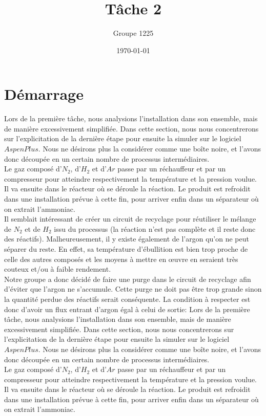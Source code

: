 \documentclass[a4paper, oneside, 12pt]{article}
\title{Tâche 2}
\author{Groupe 1225}
\date{\today}
\begin{document}
\maketitle

\section{Démarrage}

Lors de la première tâche, nous analysions l'installation dans son ensemble, mais de manière excessivement simplifiée. Dans cette section, nous nous concentrerons sur l'explicitation de la dernière étape pour ensuite la simuler sur le logiciel $Aspen Plus$. Nous ne désirons plus la considérer comme une boîte noire, et l'avons donc découpée en un certain nombre de processus intermédiaires.\\
Le gaz composé d'$N_2$, d'$H_2$ et d'$Ar$ passe par un réchauffeur et par un compresseur pour atteindre respectivement la température et la pression voulue. Il va ensuite dans le réacteur où se déroule la réaction. Le produit est refroidit dans une installation prévue à cette fin, pour arriver enfin dans un séparateur où on extrait l'ammoniac.\\
Il semblait intéressant de créer un circuit de recyclage pour réutiliser le mélange de $N_2$ et de $H_2$ issu du processus (la réaction n'est pas complète et il reste donc des réactifs). Malheureusement, il y existe également de l'argon qu'on ne peut séparer du reste. En effet, sa température d'ébullition est bien trop proche de celle des autres composés et les moyens à mettre en œuvre en seraient très couteux et/ou à faible rendement. \\
Notre groupe a donc décidé de faire une purge dans le circuit de recyclage afin d'éviter que l'argon ne s'accumule. Cette purge ne doit pas être trop grande sinon la quantité perdue des réactifs serait conséquente. La condition à respecter est donc d'avoir un flux entrant d'argon égal à celui de sortie:
Lors de la première tâche, nous analysions l'installation dans son ensemble, mais de manière excessivement simplifiée. Dans cette section, nous nous concentrerons sur l'explicitation de la dernière étape pour ensuite la simuler sur le logiciel $Aspen Plus$. Nous ne désirons plus la considérer comme une boîte noire, et l'avons donc découpée en un certain nombre de processus intermédiaires.\\
Le gaz composé d'$N_2$, d'$H_2$ et d'$Ar$ passe par un réchauffeur et par un compresseur pour atteindre respectivement la température et la pression voulue. Il va ensuite dans le réacteur où se déroule la réaction. Le produit est refroidit dans une installation prévue à cette fin, pour arriver enfin dans un séparateur où on extrait l'ammoniac.\\
\end{document}
